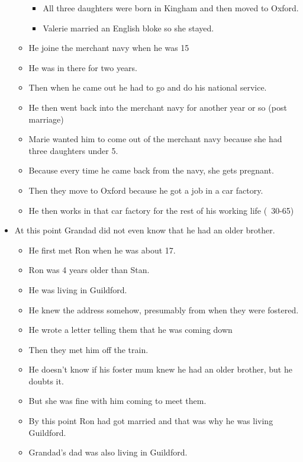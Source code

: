 \documentclass[10pt,twocolumn,letterpaper]{article}
\begin{document}
\begin{itemize}
\begin{itemize}
\begin{itemize}
                        \item All three daughters were born in Kingham and then moved to Oxford.
                        \item Valerie married an English bloke so she stayed.
                    \end{itemize}
              \item He joine the merchant navy when he was 15
              \item He was in there for two years.
              \item Then when he came out he had to go and do his national service.
              \item He then went back into the merchant navy for another year or so (post marriage)
              \item Marie wanted him to come out of the merchant navy because she had three daughters under 5.
              \item Because every time he came back from the navy, she gets pregnant.
              \item Then they move to Oxford because he got a job in a car factory.
              \item He then works in that car factory for the rest of his working life (~30-65)
          \end{itemize}
    \item At this point Grandad did not even know that he had an older brother.
          \begin{itemize}
              \item He first met Ron when he was about 17.
              \item Ron was 4 years older than Stan.
              \item He was living in Guildford.
              \item He knew the address somehow, presumably from when they were fostered.
              \item He wrote a letter telling them that he was coming down
              \item Then they met him off the train.
              \item He doesn't know if his foster mum knew he had an older brother, but he doubts it.
              \item But she was fine with him coming to meet them.
              \item By this point Ron had got married and that was why he was living Guildford.
              \item Grandad's dad was also living in Guildford.

\end{itemize}
\end{itemize}
\end{document}
